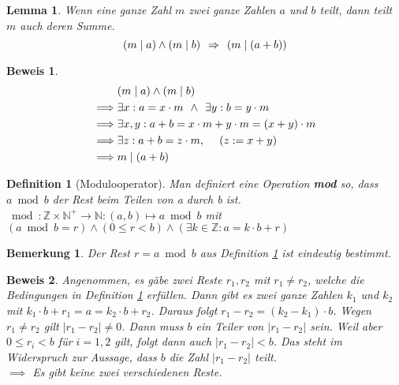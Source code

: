 \documentclass[a4paper]{article}
\newtheorem{lemma}[satz]{Lemma}
\newtheorem{bemerkung}[satz]{Bemerkung}
\newtheorem{definition}[satz]{Definition} %
\theoremstyle{nonumberplain}
\newtheorem{beweis}{Beweis}
\begin{document}
\begin{lemma}\label{l:sumteiler}
Wenn eine ganze Zahl $m$ zwei ganze Zahlen $a$ und $b$ teilt, dann teilt $m$ auch deren Summe.
\[
(m \mid a) \land (m \mid b) \hspace*{1ex} \Rightarrow \hspace{1ex}(m \mid (a + b))
\]
\end{lemma}

\begin{beweis}
\begin{align*}
& (m \mid a) \land (m \mid b) \\
\implies & \exists x : a = x \cdot m \hspace{1ex} \land \hspace{1ex} \exists y : b = y \cdot m \\
\implies & \exists x,y : a+b = x \cdot m + y \cdot m = (x+y) \cdot m \\
\implies & \exists z : a+b = z\cdot m, \hspace{3ex} (z := x+y)\\
\implies & m \mid (a+b)
\end{align*}
\end{beweis}

\begin{definition}[Modulooperator]\label{d:mod}
Man definiert eine Operation \textbf{mod} so, dass $a \bmod b$ der Rest beim Teilen von a durch b ist.\\
$ \bmod : \mathbb{Z} \times \mathbb{N}^+ \to \mathbb{N} : (a,b) \mapsto a \bmod b$ \hspace{5ex} mit
$ (a \bmod b = r) \land (0 \leq r < b) \land (\exists k \in \mathbb{Z}: a = k \cdot b + r) $
\end{definition}

\begin{bemerkung}
Der Rest $r = a \bmod b$ aus Definition \ref{d:mod} ist eindeutig bestimmt.
\end{bemerkung}

\begin{beweis}
Angenommen, es gäbe zwei Reste $r_1, r_2$ mit $r_1 \neq r_2$, welche die Bedingungen in Definition \ref{d:mod} erfüllen.
Dann gibt es zwei ganze Zahlen $k_1$ und $k_2$ mit $k_1 \cdot b + r_1 = a = k_2 \cdot b + r_2$. Daraus folgt $r_1 - r_2 = (k_2 -k_1) \cdot b$. Wegen  $r_1 \neq r_2$ gilt  $|r_1 - r_2| \neq 0$. Dann muss $b$ ein Teiler von $|r_1 - r_2|$ sein. Weil aber $0 \leq r_i < b$ für $i=1,2$ gilt, folgt dann auch $|r_1 - r_2| < b$. Das steht im Widerspruch zur Aussage, dass $b$ die Zahl $|r_1 - r_2|$ teilt.\\
$\implies$ Es gibt keine zwei verschiedenen Reste.
\end{beweis}
\end{document}
